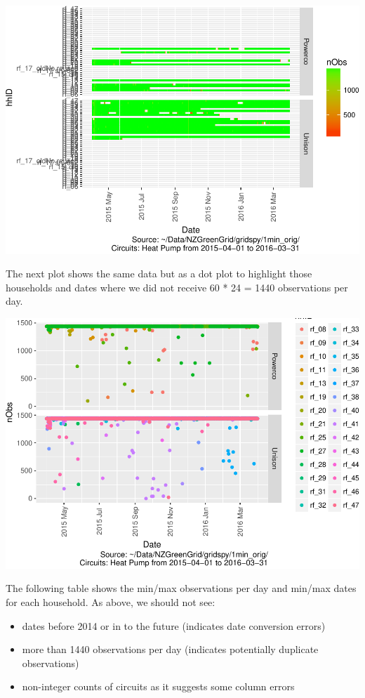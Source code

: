 \documentclass[]{article}
\providecommand{\tightlist}{%
  \setlength{\itemsep}{0pt}\setlength{\parskip}{0pt}}
\begin{document}
\includegraphics{ggHeatPumpProfiles_files/figure-latex/loadedFilesObs Tile Plot-1.pdf}

The next plot shows the same data but as a dot plot to highlight those
households and dates where we did not receive 60 * 24 = 1440
observations per day.

\includegraphics{ggHeatPumpProfiles_files/figure-latex/loadedFilesObs point plot-1.pdf}

The following table shows the min/max observations per day and min/max
dates for each household. As above, we should not see:

\begin{itemize}
\tightlist
\item
  dates before 2014 or in to the future (indicates date conversion
  errors)
\item
  more than 1440 observations per day (indicates potentially duplicate
  observations)
\item
  non-integer counts of circuits as it suggests some column errors
\end{itemize}
\end{document}
